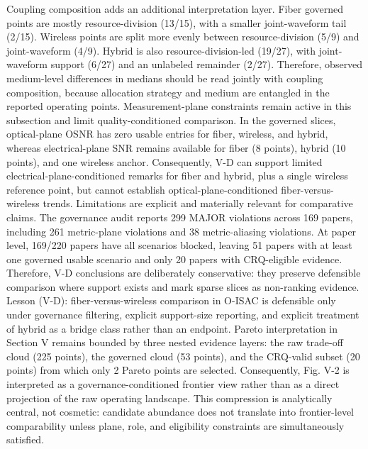 {}Coupling composition adds an additional interpretation layer. Fiber governed points are mostly resource-division (13/15), with a smaller joint-waveform tail (2/15). Wireless points are split more evenly between resource-division (5/9) and joint-waveform (4/9). Hybrid is also resource-division-led (19/27), with joint-waveform support (6/27) and an unlabeled remainder (2/27). Therefore, observed medium-level differences in medians should be read jointly with coupling composition, because allocation strategy and medium are entangled in the reported operating points.\markdownRendererParagraphSeparator
{}Measurement-plane constraints remain active in this subsection and limit quality-conditioned comparison. In the governed slices, optical-plane OSNR has zero usable entries for fiber, wireless, and hybrid, whereas electrical-plane SNR remains available for fiber (8 points), hybrid (10 points), and one wireless anchor. Consequently, V-D can support limited electrical-plane-conditioned remarks for fiber and hybrid, plus a single wireless reference point, but cannot establish optical-plane-conditioned fiber-versus-wireless trends.\markdownRendererParagraphSeparator
{}Limitations are explicit and materially relevant for comparative claims. The governance audit reports 299 MAJOR violations across 169 papers, including 261 metric-plane violations and 38 metric-aliasing violations. At paper level, 169/220 papers have all scenarios blocked, leaving 51 papers with at least one governed usable scenario and only 20 papers with CRQ-eligible evidence. Therefore, V-D conclusions are deliberately conservative: they preserve defensible comparison where support exists and mark sparse slices as non-ranking evidence.\markdownRendererParagraphSeparator
{}Lesson (V-D): fiber-versus-wireless comparison in O-ISAC is defensible only under governance filtering, explicit support-size reporting, and explicit treatment of hybrid as a bridge class rather than an endpoint.\markdownRendererParagraphSeparator
{} Pareto interpretation in Section V remains bounded by three nested evidence layers: the raw trade-off cloud (225 points), the governed cloud (53 points), and the CRQ-valid subset (20 points) from which only 2 Pareto points are selected. Consequently, Fig. V-2 is interpreted as a governance-conditioned frontier view rather than as a direct projection of the raw operating landscape. This compression is analytically central, not cosmetic: candidate abundance does not translate into frontier-level comparability unless plane, role, and eligibility constraints are simultaneously satisfied.\markdownRendererParagraphSeparator
